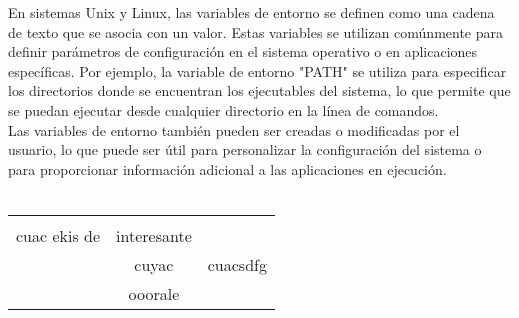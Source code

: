 \documentclass{article}
\begin{document}
En sistemas Unix y Linux, las variables de entorno se definen como una cadena de texto que se asocia con un valor. Estas variables se utilizan comúnmente para definir parámetros de configuración en el sistema operativo o en aplicaciones específicas. Por ejemplo, la variable de entorno "PATH" se utiliza para especificar los directorios donde se encuentran los ejecutables del sistema, lo que permite que se puedan ejecutar desde cualquier directorio en la línea de comandos.\\

Las variables de entorno también pueden ser creadas o modificadas por el usuario, lo que puede ser útil para personalizar la configuración del sistema o para proporcionar información adicional a las aplicaciones en ejecución.\\



\\

\begin{tabular}{c|c|c}
     &  \\cuac ekis de & interesante \\ & cuyac
     & cuacsdfg\\
     & ooorale
\end{tabular}
\end{document}
